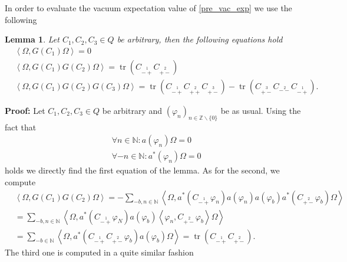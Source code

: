 \documentclass[oneside,reqno,12pt]{amsart}
\newtheorem{Lemma}[Def]{Lemma}
\DeclareMathOperator{\tr}{tr}
\begin{document}
In order to evaluate the vacuum expectation value of \eqref{pre_vac_exp} we use the following 
\begin{Lemma}\label{lemma:vac_exp}
Let \(C_1,C_2,C_3\in Q\) be arbitrary, then the following equations hold
\begin{align}
&\left<\Omega, G(C_1) \Omega\right>=0\\
&\left<\Omega, G(C_1)G(C_2) \Omega\right>=\tr\left(C_{\stackrel{1}{-+}}C_{\stackrel{2}{+-}}\right)\\
&\left<\Omega, G(C_1)G(C_2)G(C_3) \Omega\right>=
\tr\left(C_{\stackrel{1}{-+}}C_{\stackrel{2}{++}}C_{\stackrel{3}{+-}}\right)-
\tr\left(C_{\stackrel{3}{+-}}C_{\stackrel{2}{--}}C_{\stackrel{1}{-+}}\right)
.\end{align}
\end{Lemma}
{\bf Proof:} Let \(C_1,C_2,C_3 \in Q\) be arbitrary and \((\varphi_n)_{n\in \mathbb{Z}\backslash\{0\}}\) be as usual. Using the fact that 
\begin{align*}
&\forall n \in \mathbb{N}: a(\varphi_n)\Omega=0\\
&\forall -n \in \mathbb{N}: a^*(\varphi_n)\Omega=0 
\end{align*}
holds we directly find the first equation of the lemma. As for the second, we compute
\begin{align*}
&\left<\Omega, G(C_1)G(C_2)\Omega\right>= -\sum_{-b,n\in\mathbb{N}} \left< \Omega, a^*\left(C_{\stackrel{1}{-+}}\varphi_n\right) a(\varphi_n) a(\varphi_b) a^*\left(C_{\stackrel{2}{+-}}\varphi_b\right)\Omega\right>\\
&=\sum_{-b,n\in\mathbb{N}}\left<\Omega, a^*\left(C_{\stackrel{1}{-+}}\varphi_N\right) a(\varphi_b)\left<\varphi_n,C_{\stackrel{2}{+-}}\varphi_b\right>\Omega\right>\\
&=\sum_{-b\in\mathbb{N}} \left<\Omega, a^*\left(C_{\stackrel{1}{-+}}C_{\stackrel{2}{+-}}\varphi_b\right)a(\varphi_b)\Omega\right>
=\tr\left(C_{\stackrel{1}{-+}}C_{\stackrel{2}{+-}}\right)
.\end{align*}
The third one is computed in a quite similar fashion
\end{document}
